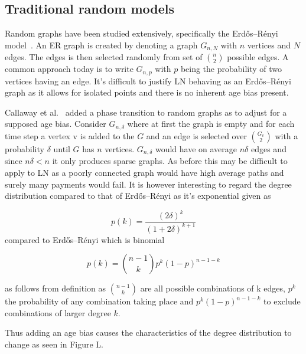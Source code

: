 \subsection{Traditional random models}

Random graphs have been studied extensively, specifically the Erdős–Rényi model~\cite{erdos:renyi:random:graphs}. An ER graph is created by denoting a graph $G_{n,N}$ with $n$ vertices and $N$ edges. The edges is then selected randomly from set of ${n \choose 2}$ possible edges. A common approach today is to write $G_{n,p}$ with $p$ being the probability of two vertices having an edge. It's difficult to justify LN behaving as an Erdős–Rényi graph as it allows for isolated points and there is no inherent age bias present. 

Callaway et al.~\cite{callaway:hopcraft:randomly:grown:graphs} added a phase transition to random graphs as to adjust for a supposed age bias. Consider $G_{n,\delta}$ where at first the graph is empty and for each time step a vertex v is added to the $G$ and an edge is selected over $G_v \choose 2$ with a probability $\delta$ until $G$ has $n$ vertices. $G_{n,\delta}$ would have on average $n\delta$ edges and since $n\delta < n$ it only produces sparse graphs. As before this may be difficult to apply to LN as a poorly connected graph would have high average paths and surely many payments would fail. It is however interesting to regard the degree distribution compared to that of Erdős–Rényi as it's exponential given as

\begin{equation}
	p(k) = \dfrac{(2\delta)^k}{(1 + 2\delta)^{k+1}} 
	\label{eq:callaway}
\end{equation}
compared to Erdős–Rényi which is binomial

\begin{equation}
	p(k) = {n-1 \choose k} p^k(1-p)^{n-1-k} 
	\label{eq:erdos:renyi}
\end{equation}

as follows from definition as ${n-1 \choose k}$ are all possible combinations of k edges,  $p^k$ the probability of any combination taking place and $p^k(1-p)^{n-1-k}$ to exclude combinations of larger degree $k$.

Thus adding an age bias causes the characteristics of the degree distribution to change as seen in Figure L.

